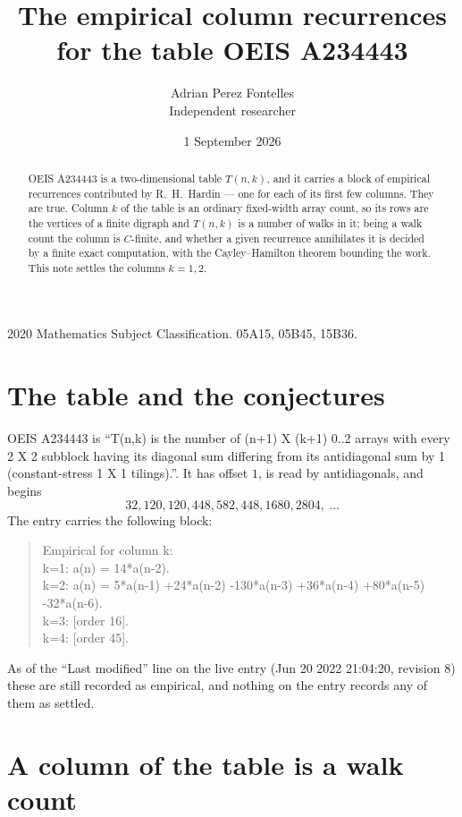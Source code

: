 \documentclass[11pt,a4paper]{article}
\title{The empirical column recurrences for the table OEIS A234443}
\author{Adrian Perez Fontelles\\ \small Independent researcher}
\date{1 September 2026}
\theoremstyle{plain}
\theoremstyle{definition}
\begin{document}
\maketitle

\begin{abstract}
OEIS A234443 is a two-dimensional table $T(n,k)$, and it carries a block of empirical
recurrences contributed by R.~H.~Hardin --- one for each of its first few columns. They are
true. Column $k$ of the table is an ordinary fixed-width array count, so its rows are the
vertices of a finite digraph and $T(n,k)$ is a number of walks in it; being a walk count the
column is $C$-finite, and whether a given recurrence annihilates it is decided by a finite
exact computation, with the Cayley--Hamilton theorem bounding the work. This note settles the
columns $k=1, 2$.
\end{abstract}

\noindent\small 2020 Mathematics Subject Classification. 05A15, 05B45, 15B36.\normalsize

\section{The table and the conjectures}

OEIS A234443 is ``T(n,k) is the number of (n+1) X (k+1) 0..2 arrays with every 2 X 2 subblock having its diagonal sum differing from its antidiagonal sum by 1 (constant-stress 1 X 1 tilings).''. It has offset $1$, is
read by antidiagonals, and begins
\[
32, 120, 120, 448, 582, 448, 1680, 2804,\ \dots
\]
The entry carries the following block:
\begin{quote}\small
Empirical for column k:\\
k=1: a(n) = 14*a(n-2).\\
k=2: a(n) = 5*a(n-1) +24*a(n-2) -130*a(n-3) +36*a(n-4) +80*a(n-5) -32*a(n-6).\\
k=3: [order 16].\\
k=4: [order 45].\\
\end{quote}
As of the ``Last modified'' line on the live entry (Jun 20 2022 21:04:20, revision 8) these are still
recorded as empirical, and nothing on the entry records any of them as settled.

\section{A column of the table is a walk count}
\end{document}
